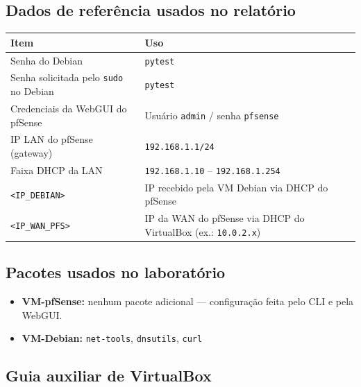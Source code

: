 \subsection{Dados de referência usados no relatório}

\begin{tabularx}{\linewidth}{lX}
\toprule
\textbf{Item} & \textbf{Uso} \\
\midrule
Senha do Debian & \texttt{pytest} \\
Senha solicitada pelo \texttt{sudo} no Debian & \texttt{pytest} \\
Credenciais da WebGUI do pfSense & Usuário \texttt{admin} / senha \texttt{pfsense} \\
IP LAN do pfSense (gateway) & \texttt{192.168.1.1/24} \\
Faixa DHCP da LAN & \texttt{192.168.1.10} -- \texttt{192.168.1.254} \\
\texttt{<IP\_DEBIAN>} & IP recebido pela VM Debian via DHCP do pfSense \\
\texttt{<IP\_WAN\_PFS>} & IP da WAN do pfSense via DHCP do VirtualBox (ex.: \texttt{10.0.2.x}) \\
\bottomrule
\end{tabularx}

\subsection{Pacotes usados no laboratório}

\begin{itemize}
  \item \textbf{VM-pfSense:} nenhum pacote adicional --- configuração feita pelo CLI e pela WebGUI.
  \item \textbf{VM-Debian:} \texttt{net-tools}, \texttt{dnsutils}, \texttt{curl}
\end{itemize}

\subsection{Guia auxiliar de VirtualBox}


